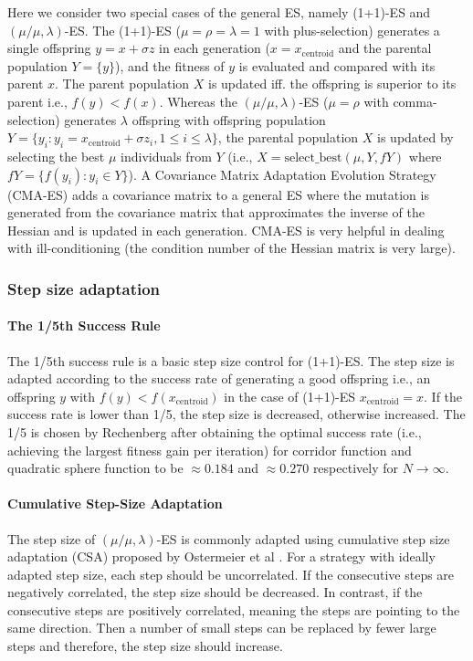 Here we consider two special cases of the general ES, namely (1+1)-ES and $(\mu/\mu,\lambda)$-ES. The (1+1)-ES ($\mu = \rho = \lambda=1$ with plus-selection) generates a single offspring $y = x + \sigma z$ in each generation ($x=x_{\text{centroid}}$ and the parental population $Y = \{y\}$), and the fitness of $y$ is evaluated and compared with its parent $x$. The parent population $X$ is updated iff. the offspring is superior to its parent i.e., $f(y)<f(x)$. Whereas the $(\mu/\mu,\lambda)$-ES ($\mu=\rho$ with comma-selection) generates $\lambda$ offspring with offspring population $Y = \{ y_i: y_i = x_{\text{centroid}} + \sigma z_i, 1\leq i \leq \lambda \}$, the parental population $X$ is updated by selecting the best $\mu$ individuals from $Y$ (i.e., $X = \text{select\_best}(\mu,Y,fY)$ where $fY = \{f(y_i):y_i \in Y \}$). A Covariance Matrix Adaptation Evolution Strategy (CMA-ES) adds a covariance matrix to a general ES where the mutation is generated from the covariance matrix that approximates the inverse of the Hessian and is updated in each generation. CMA-ES is very helpful in dealing with ill-conditioning (the condition number of the Hessian matrix is very large). 


\subsubsection{Step size adaptation}\label{sssec:step_size_adaptation}\hfill
\paragraph{The 1/5th Success Rule} 
The 1/5th success rule is a basic step size control for (1+1)-ES. The step size is adapted according to the success rate of generating a good offspring i.e., an offspring $y$ with $f(y)<f(x_{\text{centroid}})$ in the case of (1+1)-ES $x_{\text{centroid}}=x$. If the success rate is lower than 1/5, the step size is decreased, otherwise increased. The 1/5 is chosen by Rechenberg \cite{Rechenberg1973} after obtaining the optimal success rate (i.e., achieving the largest fitness gain per iteration) for corridor function and quadratic sphere function to be $\approx 0.184$ and $\approx 0.270$ respectively for $N \rightarrow \infty$.  
\paragraph{Cumulative Step-Size Adaptation} 
The step size of $(\mu/\mu,\lambda)$-ES is commonly adapted using cumulative step size adaptation (CSA) proposed by Ostermeier et al \cite{Ostermeier:1994:DAS:1326675.1326679}. For a strategy with ideally adapted step size, each step should be uncorrelated. If the consecutive steps are negatively correlated, the step size should be decreased. In contrast, if the consecutive steps are positively correlated, meaning the steps are pointing to the same direction. Then a number of small steps can be replaced by fewer large steps and therefore, the step size should increase. 


